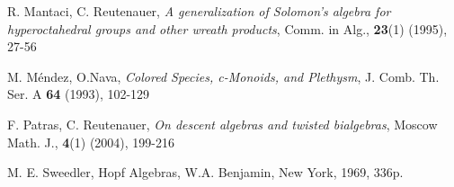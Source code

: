 \documentclass[11pt,reqno]{amsart}
\numberwithin{equation}{section}
\begin{document}
\begin{thebibliography}{\hphantom{99}}
   {\sc R. Mantaci, C. Reutenauer}, {\em A generalization of Solomon's algebra for hyperoctahedral groups and other wreath products}, Comm. in Alg., {\bf 23}(1) (1995),   27-56

   {\sc M. M\'endez, O.Nava}, {\em Colored Species, c-Monoids, and Plethysm}, J. Comb. Th. Ser. A {\bf 64} (1993), 102-129

   {\sc F. Patras, C. Reutenauer}, {\em On descent algebras and twisted bialgebras}, Moscow Math. J., {\bf 4}(1) (2004), 199-216

   {\sc M. E. Sweedler}, Hopf Algebras, W.A. Benjamin, New York, 1969, 336p.

\end{thebibliography}
\end{document}
